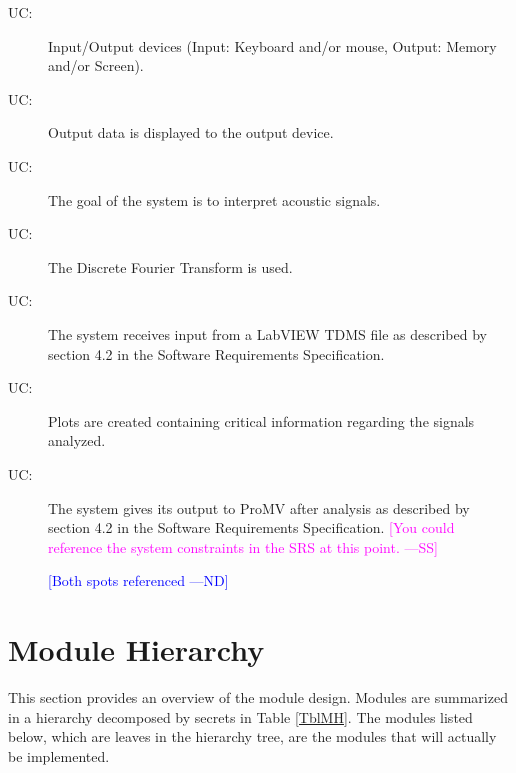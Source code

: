 \documentclass[12pt]{article}
\newcommand{\authornote}[3]{\textcolor{#1}{[#3 ---#2]}}
\newcommand{\authornote}[3]{}
\newcommand{\wss}[1]{\authornote{magenta}{SS}{#1}}
\newcommand{\nd}[1]{\authornote{blue}{ND}{#1}}
\newcounter{ucnum}
\newcommand{\uctheucnum}{UC\theucnum}
\begin{document}
\begin{description}
\item[ \uctheucnum \label{ucIO}:] Input/Output devices
  (Input: Keyboard and/or mouse, Output: Memory and/or Screen).
\item[ \uctheucnum \label{ucOutput}:] Output data is
  displayed to the output device.
\item[ \uctheucnum \label{ucGoal}:] The goal of the system
  is to interpret acoustic signals.
\item[ \uctheucnum \label{ucDFT}:] The Discrete Fourier 
Transform is used.
\item[ \uctheucnum \label{ucInput}:] The system receives 
input from a LabVIEW TDMS file as described by section 4.2 in the Software
 Requirements Specification. 
\item[ \uctheucnum \label{ucPlot}:] Plots are created 
containing critical information regarding the signals analyzed.
\item[ \uctheucnum \label{ucProMV}:] The system gives 
its output to ProMV after analysis as described by section 4.2 in the Software
 Requirements Specification. \wss{You could reference the system constraints
  in the SRS at this point.}
  
  \nd{Both spots referenced}
\end{description}

\section{Module Hierarchy} \label{SecMH}

This section provides an overview of the module design. Modules are summarized
in a hierarchy decomposed by secrets in Table \ref{TblMH}. The modules listed
below, which are leaves in the hierarchy tree, are the modules that will
actually be implemented.
\end{document}
